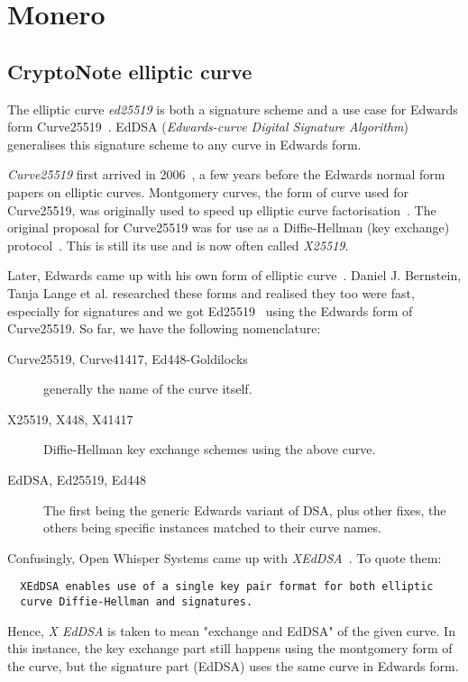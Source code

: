 \chapter{Monero}
%
\section{CryptoNote elliptic curve} \label{sec:ed25519}
The elliptic curve \emph{ed25519} is both a signature scheme and a use case for Edwards form Curve25519~\cite{eddsa}. EdDSA (\emph{Edwards-curve Digital Signature Algorithm}) generalises this signature scheme to any curve in Edwards form.

\emph{Curve25519} first arrived in 2006~\cite{curve25519}, a few years before the Edwards normal form papers on elliptic curves. Montgomery curves, the form of curve used for Curve25519, was originally used to speed up elliptic curve factorisation~\cite{montgomery}. The original proposal for Curve25519 was for use as a Diffie-Hellman (key exchange) protocol~\cite{Diffie:2006:NDC:2263321.2269104}. This is still its use and is now often called \emph{X25519}.

Later, Edwards came up with his own form of elliptic curve~\cite{edward}. Daniel J. Bernstein, Tanja Lange et al. researched these forms and realised they too were fast, especially for signatures and we got Ed25519~\cite{eddsa} using the Edwards form of Curve25519. So far, we have the following nomenclature:
\begin{description}
  \item [Curve25519, Curve41417, Ed448-Goldilocks] generally the name of the curve itself.
  \item [X25519, X448, X41417] Diffie-Hellman key exchange schemes using the above curve.
  \item [EdDSA, Ed25519, Ed448] The first being the generic Edwards variant of DSA, plus other fixes, the others being specific instances matched to their curve names.
\end{description}
Confusingly, Open Whisper Systems came up with \emph{XEdDSA}~\cite{signal}. To quote them:
\begin{verbatim}
  XEdDSA enables use of a single key pair format for both elliptic
  curve Diffie-Hellman and signatures.
\end{verbatim}

Hence, \emph{X EdDSA} is taken to mean "exchange and EdDSA" of the given curve. In this instance, the key exchange part still happens using the montgomery form of the curve, but the signature part (EdDSA) uses the same curve in Edwards form.
\pagebreak

